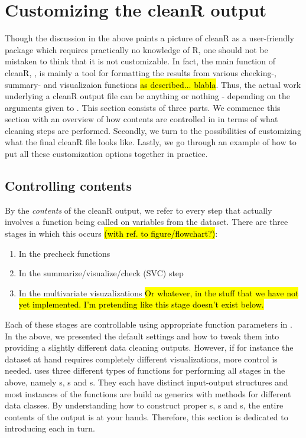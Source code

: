 \documentclass[article]{jss}
\begin{document}
\section{Customizing the cleanR output}
Though the discussion in the above paints a picture of cleanR as a user-friendly package which requires practically no knowledge of R, one should not be mistaken to think that it is not customizable. In fact, the main function of cleanR, , is mainly a tool for formatting the results from various checking-, summary- and visualizaion functions \hl{as described... blabla}. Thus, the actual work underlying a cleanR output file can be anything or nothing - depending on the arguments given to . This section consists of three parts. We commence this section with an overview of how contents are controlled in  in terms of what cleaning steps are performed. Secondly, we turn to the possibilities of customizing what the final cleanR file looks like. Lastly, we go through an example of how to put all these customization options together in practice.

\subsection{Controlling contents}
By the \textit{contents} of the cleanR output, we refer to every step that actually involves a function being called on variables from the dataset. There are three stages in which this occurs \hl{(with ref. to figure/flowchart?)}:
\begin{enumerate}
\item In the precheck functions
\item In the summarize/visualize/check (SVC) step
\item In the multivariate visuzalizations \hl{Or whatever, in the stuff that we have not yet implemented. I'm pretending like this stage doesn't exist below.}
\end{enumerate}
Each of these stages are controllable using appropriate function parameters in . In the above, we presented the default  settings and how to tweak them into providing a slightly different data cleaning outputs. However, if for instance the dataset at hand requires completely different visualizations, more control is needed.  uses three different types of functions for performing all stages in the above, namely s, s and s. They each have distinct input-output structures and most instances of the functions are build as  generics with methods for different data classes. By understanding how to construct proper s, s and s, the entire contents of the  output is at your hands. Therefore, this section is dedicated to introducing each in turn.\\
\end{document}

